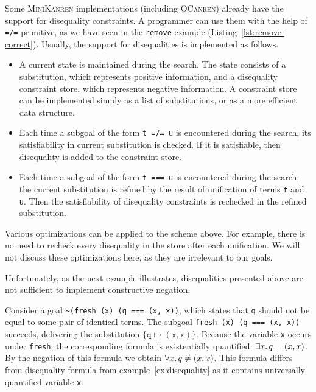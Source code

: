 Some \textsc{MiniKanren} implementations (including \textsc{OCanren})
already have the support for disequality constraints.
A programmer can use them with the help of 
\lstinline{=/=} primitive, as we have seen 
in the \lstinline{remove} example (Listing~\ref{lst:remove-correct}).
Usually, the support for disequalities is implemented as follows.

\begin{itemize}
  \item A current state is maintained during the search.
        The state consists of a substitution, 
        which represents positive information,
        and a disequality constraint store, 
        which represents negative information.
        A constraint store can be implemented simply 
        as a list of substitutions,
        or as a more efficient data structure.        

  \item Each time a subgoal of the form \lstinline{t =/= u} 
        is encountered during the search,
        its satisfiability in current substitution is checked.
        If it is satisfiable, then disequality 
        is added to the constraint store.

  \item Each time a subgoal of the form \lstinline{t === u} 
        is encountered during the search, 
        the current substitution is refined by the result 
        of unification of terms \lstinline{t} and \lstinline{u}. 
        Then the satisfiability of disequality constraints is rechecked 
        in the refined substitution.
\end{itemize}

Various optimizations can be applied to the scheme above.
For example, there is no need to recheck every 
disequality in the store after each unification.
We will not discuss these optimizations here, 
as they are irrelevant to our goals. 

Unfortunately, as the next example illustrates, 
disequalities presented above are not sufficient
to implement constructive negation.

\begin{example}
  \label{ex:univ-disequality}
  Consider a goal \lstinline{~(fresh (x) (q === (x, x))},
  which states that \lstinline{q} should not be equal to
  some pair of identical terms.
  The subgoal \lstinline{fresh (x) (q === (x, x))} succeeds,
  delivering the substitution $\mathtt{\{q \mapsto (x, x)\}}$.
  Because the variable \lstinline{x} occurs under \lstinline{fresh},
  the corresponding formula is existentially quantified:
  $\exists x\ldotp q = (x, x)$.
  By the negation of this formula we obtain 
  $\forall x\ldotp q \neq (x, x)$.
  This formula differs from disequality formula 
  from example~\ref{ex:disequality} as it 
  contains universally quantified variable \lstinline{x}.
\end{example}

